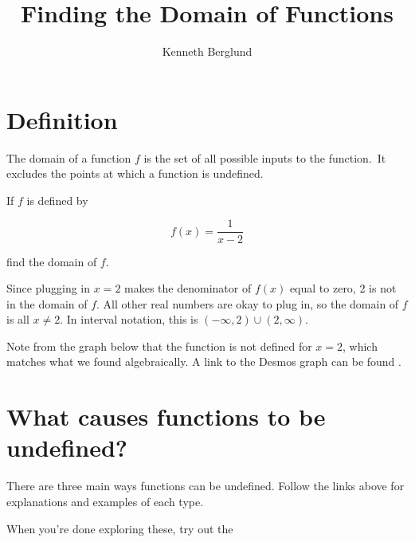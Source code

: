 \documentclass{ximera}
\title{Finding the Domain of Functions}
\author{Kenneth Berglund}
\begin{document}
\begin{abstract}
\end{abstract}
\maketitle

\section{Definition}

The domain of a function $f$ is the set of all possible inputs to the function. It excludes the points at which a function is undefined. 

\begin{example}
If $f$ is defined by 

$$f(x) = \frac{1}{x - 2}$$

find the domain of $f$. 

\begin{explanation}
Since plugging in $x = 2$ makes the denominator of $f(x)$ equal to zero, 2 is not in the domain of $f$. All other real numbers are okay to plug in, so the domain of $f$ is all $x \ne 2$. In interval notation, this is $(-\infty, 2) \cup (2, \infty)$.

Note from the graph below that the function is not defined for $x = 2$, which matches what we found algebraically. A link to the Desmos graph can be found . 

\begin{center}
\end{center}
\end{explanation}
\end{example}

\section{What causes functions to be undefined?}
There are three main ways functions can be undefined. Follow the links above for explanations and examples of each type.




When you're done exploring these, try out the 
\end{document}
